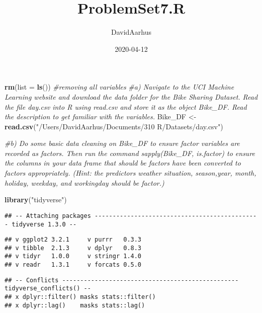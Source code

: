 \documentclass[]{article}
\title{ProblemSet7.R}
\author{DavidAarhus}
\date{2020-04-12}
\newenvironment{Shaded}{\begin{snugshade}}{\end{snugshade}}
\newcommand{\CommentTok}[1]{\textcolor[rgb]{0.56,0.35,0.01}{\textit{#1}}}
\newcommand{\DataTypeTok}[1]{\textcolor[rgb]{0.13,0.29,0.53}{#1}}
\newcommand{\KeywordTok}[1]{\textcolor[rgb]{0.13,0.29,0.53}{\textbf{#1}}}
\newcommand{\NormalTok}[1]{#1}
\newcommand{\StringTok}[1]{\textcolor[rgb]{0.31,0.60,0.02}{#1}}
\begin{document}
\maketitle

\begin{Shaded}
\begin{Highlighting}[]
\KeywordTok{rm}\NormalTok{(}\DataTypeTok{list =} \KeywordTok{ls}\NormalTok{()) }\CommentTok{#removing all variables}
\CommentTok{#a) Navigate to the UCI Machine Learning website and download the data folder for the Bike Sharing Dataset. Read the file day.csv into R using read.csv and store it as the object Bike_DF. Read the description to get familiar with the variables.}
\NormalTok{ Bike_DF <-}\StringTok{ }\KeywordTok{read.csv}\NormalTok{(}\StringTok{"/Users/DavidAarhus/Documents/310 R/Datasets/day.csv"}\NormalTok{)}
  

\CommentTok{#b) Do some basic data cleaning on Bike_DF to ensure factor variables are recorded as factors. Then run the command sapply(Bike_DF, is.factor) to ensure the columns in your data frame that should be factors have been converted to factors appropriately. (Hint: the predictors weather situation, season,year, month, holiday, weekday, and workingday should be factor.)}
                                                                                                                                                                                                                                                             
\KeywordTok{library}\NormalTok{(}\StringTok{"tidyverse"}\NormalTok{)}
\end{Highlighting}
\end{Shaded}

\begin{verbatim}
## -- Attaching packages ---------------------------------------------- tidyverse 1.3.0 --
\end{verbatim}

\begin{verbatim}
## v ggplot2 3.2.1     v purrr   0.3.3
## v tibble  2.1.3     v dplyr   0.8.3
## v tidyr   1.0.0     v stringr 1.4.0
## v readr   1.3.1     v forcats 0.5.0
\end{verbatim}

\begin{verbatim}
## -- Conflicts ------------------------------------------------- tidyverse_conflicts() --
## x dplyr::filter() masks stats::filter()
## x dplyr::lag()    masks stats::lag()
\end{verbatim}
\end{document}
